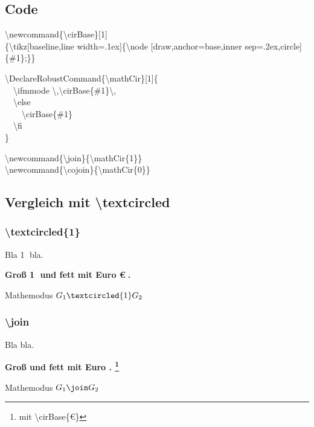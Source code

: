 \subsection{Code}
{\ttfamily\small
\textbackslash newcommand\{\textbackslash cirBase\}[1]\\
\{\textbackslash tikz[baseline,line width=.1ex]\{\textbackslash node [draw,anchor=base,inner sep=.2ex,circle] \{\#1\};\}\}

\textbackslash DeclareRobustCommand\{\textbackslash mathCir\}[1]\{\\
\ \ \textbackslash ifmmode \textbackslash ,\textbackslash cirBase\{\#1\}\textbackslash ,\\
\ \ \textbackslash else\\
\ \ \ \ \textbackslash cirBase\{\#1\}\\
\ \ \textbackslash fi\\
\}

\textbackslash newcommand\{\textbackslash join\}\{\textbackslash mathCir\{1\}\}\\
\textbackslash newcommand\{\textbackslash cojoin\}\{\textbackslash mathCir\{0\}\}
}%

\subsection{Vergleich mit \textbackslash textcircled}
\subsubsection{\textbackslash textcircled\{1\}}

Bla \textcircled{1} bla.

{\huge\bfseries Groß \textcircled{1} und fett mit Euro \textcircled{€}.}

Mathemodus $G_1 \textcircled{1} G_2$


\subsubsection{\textbackslash join}

Bla \join bla.

{\huge\bfseries Groß \join und fett mit Euro . \footnote{mit \textbackslash cirBase\{€\}}}

Mathemodus $G_1\join G_2$